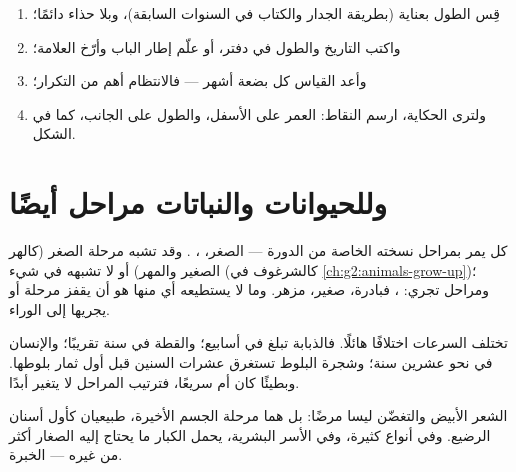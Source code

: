\begin{method}\label{met:g3:stages-of-life:keep}
\begin{enumerate}
  \item قِس الطول بعناية (بطريقة الجدار والكتاب في السنوات
        السابقة)، وبلا حذاء دائمًا؛
  \item واكتب التاريخ والطول في دفتر، أو علّم إطار الباب وأرّخ
        العلامة؛
  \item وأعد القياس كل بضعة أشهر --- فالانتظام أهم من التكرار؛
  \item ولترى الحكاية، ارسم النقاط: العمر على الأسفل، والطول على
        الجانب، كما في الشكل.
\end{enumerate}
\end{method}

\section{وللحيوانات والنباتات مراحل أيضًا}

\begin{proposition}\label{prop:g3:stages-of-life:animals}
كل  يمر بمراحل نسخته الخاصة من الدورة --- الصغر، ،
. وقد تشبه مرحلة الصغر  (كالهر الصغير والمهر) أو لا
تشبهه في شيء (كالشرغوف  في \cref{ch:g2:animals-grow-up})؛
ومراحل  تجري: ، فبادرة،  صغير،  مزهر. وما لا
يستطيعه أي منها هو أن يقفز مرحلة أو يجريها إلى الوراء.
\end{proposition}
\admitted

\begin{example}\label{ex:g3:stages-of-life:speeds}
تختلف السرعات اختلافًا هائلًا. فالذبابة تبلغ في أسابيع؛ والقطة في
سنة تقريبًا؛ والإنسان في نحو عشرين سنة؛ وشجرة البلوط تستغرق عشرات
السنين قبل أول ثمار بلوطها. وبطيئًا كان أم سريعًا، فترتيب المراحل
لا يتغير أبدًا.
\end{example}

\begin{remark}\label{rem:g3:stages-of-life:oldage}
الشعر الأبيض والتغضّن ليسا مرضًا: بل هما مرحلة الجسم الأخيرة،
طبيعيان كأول أسنان الرضيع. وفي أنواع كثيرة، وفي الأسر البشرية،
يحمل الكبار ما يحتاج إليه الصغار أكثر من غيره --- الخبرة.
\end{remark}

